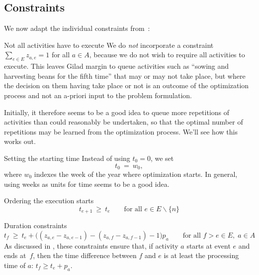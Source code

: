 \documentclass[11pt,reqno]{amsart}
\numberwithin{equation}{section}
\begin{document}
\subsection{Constraints}

We now adapt the individual constraints from~\cite{artigues-etal11}:

\begin{mydesc}

\item[Not all activities have to execute] We do \emph{not} incorporate a constraint
  $\sum_{e\in E} z_{a,e}=1$ for all $a\in A$, because we do not wish to require all
  activities to execute. This leaves Gilad margin to queue activities such as ``sowing and
  harvesting beans for the fifth time'' that may or may not take place, but where the
  decision on them having take place or not is an outcome of the optimization process and
  not an a-priori input to the problem formulation.

  Initially, it therefore seems to be a good idea to queue more repetitions of activities
  than could reasonably be undertaken, so that the optimal number of repetitions may be
  learned from the optimization process. We'll see how this works out.

\item[Setting the starting time] Instead of using $t_0=0$, we set
  \begin{equation}
     t_0
     \ = \
     w_0,
  \end{equation}
  where $w_0$ indexes the week of the year where optimization starts. In general, using
  weeks as units for time seems to be a good idea.

\item[Ordering the execution starts]
  \begin{equation}
     t_{e+1} 
     \ \ge \
     t_e
     \qquad\text{for all }
      e\in E\smallsetminus\{n\}
  \end{equation}

\item[Duration constraints]
  \begin{equation}
     t_f 
     \ \ge \
     t_e + \big((z_{a,e} - z_{a,e-1} ) - (z_{a,f} - z_{a,f-1}) - 1\big) p_a
     \qquad\text{for all } f>e\in E,\; a\in A
  \end{equation}
  As discussed in \cite{artigues-etal11}, these constraints ensure that,
if activity $a$ starts at event $e$ and ends at~$f$, then the time difference between  $f$
and $e$ is at least the processing time of $a$: $t_f \ge t_e + p_a$.


\end{mydesc}
\end{document}
